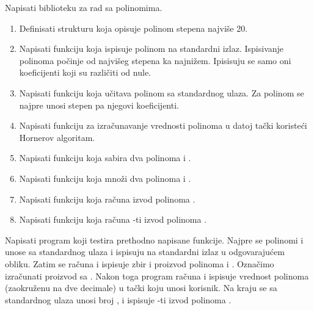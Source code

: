 \begin{Exercise}[label=1_03] %
Napisati biblioteku za rad sa polinomima.
  \begin{enumerate}
  \item Definisati strukturu  koja opisuje polinom stepena najviše 20. 
  \item Napisati funkciju  koja ispisuje polinom  na standardni izlaz. Ispisivanje polinoma počinje od najvišeg stepena ka najnižem. Ipisisuju se samo oni koeficijenti koji su različiti od nule.
  \item Napisati funkciju  koja učitava polinom sa standardnog
    ulaza. Za polinom se najpre unosi stepen pa njegovi koeficijenti.
  \item Napisati funkciju  za izračunavanje vrednosti polinoma  u
    datoj tački  koristeći Hornerov algoritam.
  \item Napisati funkciju  koja sabira dva polinoma  i .
  \item Napisati funkciju  koja množi dva polinoma  i .
  \item Napisati funkciju  koja računa izvod polinoma .
  \item Napisati funkciju  koja računa -ti izvod polinoma .
  \end{enumerate}

Napisati program koji testira prethodno napisane funkcije. Najpre se polinomi  i  unose sa standardnog ulaza i ispisuju na standardni izlaz u odgovarajućem obliku. Zatim se računa i ispisuje zbir i proizvod polinoma  i . Označimo izračunati proizvod sa  . Nakon toga program računa i ispisuje vrednost polinoma  (zaokruženu na dve decimale) u tački koju unosi korisnik. Na kraju se sa standardnog ulaza unosi broj , i ispisuje -ti izvod polinoma .


\end{Exercise}

